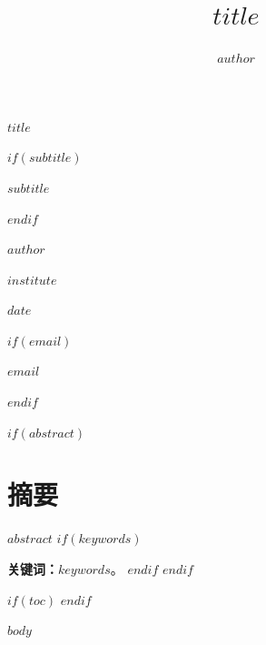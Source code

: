 \documentclass[12pt,a4paper,twoside,openany]{ctexbook}
\title{$title$}
\author{$author$}
\numberwithin{figure}{chapter}
\numberwithin{table}{chapter}
\begin{document}
\begin{titlepage}
\centering
\vspace*{3cm}
{\Huge\bfseries $title$\par}
$if(subtitle)$
\vspace{0.8cm}
{\LARGE $subtitle$\par}
$endif$
\vspace{2.5cm}
{\Large $author$\par}
\vspace{1cm}
{\large $institute$\par}
\vspace{1.5cm}
{\large $date$\par}
$if(email)$
\vspace{1cm}
{\normalsize $email$\par}
$endif$
\vfill
\end{titlepage}

$if(abstract)$
\chapter*{摘要}
$abstract$
$if(keywords)$
\par\vspace{1em}
\noindent\textbf{关键词：}$keywords$。
$endif$
\clearpage
$endif$

$if(toc)$
\tableofcontents
$endif$

$body$
\end{document}
